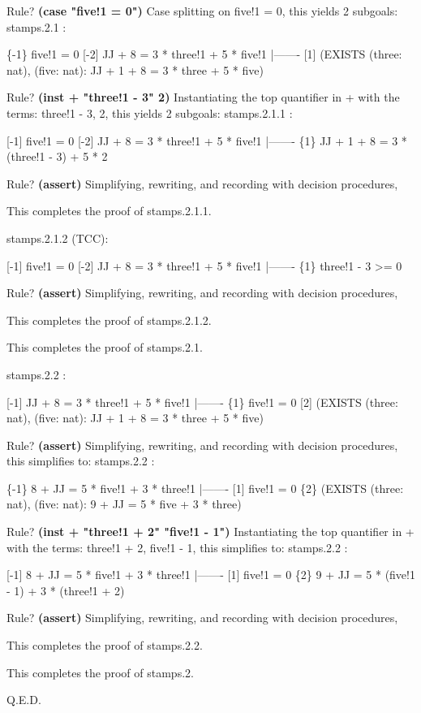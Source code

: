 \begin{pvsscript}
     Rule? {\bf (case "five!1 = 0")}
     Case splitting on 
        five!1 = 0, 
     this yields  2 subgoals: 
     stamps.2.1 :  
     
     \{-1\}   five!1 = 0
     [-2]   JJ + 8 = 3 * three!1 + 5 * five!1
       |-------
     [1]   (EXISTS (three: nat), (five: nat): JJ + 1 + 8 = 3 * three + 5 * five)
     
     Rule? {\bf (inst + "three!1 - 3" 2)}
     Instantiating the top quantifier in + with the terms: 
      three!1 - 3, 2,
     this yields  2 subgoals: 
     stamps.2.1.1 :  
     
     [-1]   five!1 = 0
     [-2]   JJ + 8 = 3 * three!1 + 5 * five!1
       |-------
     \{1\}   JJ + 1 + 8 = 3 * (three!1 - 3) + 5 * 2
     
     Rule? {\bf (assert)}
     Simplifying, rewriting, and recording with decision procedures,
     
     This completes the proof of stamps.2.1.1.
     
     stamps.2.1.2 (TCC):   
     
     [-1]   five!1 = 0
     [-2]   JJ + 8 = 3 * three!1 + 5 * five!1
       |-------
     \{1\}   three!1 - 3 >= 0
     
     Rule? {\bf (assert)}
     Simplifying, rewriting, and recording with decision procedures,
     
     This completes the proof of stamps.2.1.2.
     
     
     This completes the proof of stamps.2.1.
     
     stamps.2.2 :  
     
     [-1]   JJ + 8 = 3 * three!1 + 5 * five!1
       |-------
     \{1\}   five!1 = 0
     [2]   (EXISTS (three: nat), (five: nat): JJ + 1 + 8 = 3 * three + 5 * five)
     
     Rule? {\bf (assert)}
     Simplifying, rewriting, and recording with decision procedures,
     this simplifies to: 
     stamps.2.2 :  
     
     \{-1\}   8 + JJ = 5 * five!1 + 3 * three!1
       |-------
     [1]   five!1 = 0
     \{2\}   (EXISTS (three: nat), (five: nat): 9 + JJ = 5 * five + 3 * three)
     
     Rule? {\bf (inst + "three!1 + 2" "five!1 - 1")}
     Instantiating the top quantifier in + with the terms: 
      three!1 + 2, five!1 - 1,
     this simplifies to: 
     stamps.2.2 :  
     
     [-1]   8 + JJ = 5 * five!1 + 3 * three!1
       |-------
     [1]   five!1 = 0
     \{2\}   9 + JJ = 5 * (five!1 - 1) + 3 * (three!1 + 2)
     
     Rule? {\bf (assert)}
     Simplifying, rewriting, and recording with decision procedures,
     
     This completes the proof of stamps.2.2.
     
     
     This completes the proof of stamps.2.
     
     Q.E.D.


\end{pvsscript}

